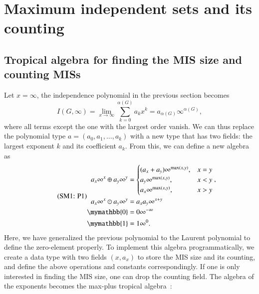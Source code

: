 \documentclass[onefignum, onetabnum]{siamart190516}
\newcommand{\eqname}[1]{\stepcounter{equation}\tag{\theequation : #1}}
\newcommand{\<}{\langle}
\renewcommand{\>}{\rangle}
\begin{document}

\section{Maximum independent sets and its counting}\label{sec:counting}
\subsection{Tropical algebra for finding the MIS size and counting MISs}
Let $x=\infty$, the independence polynomial in the previous section becomes
\begin{equation}
I(G, \infty) = \lim_{x\rightarrow \infty}\sum_{k=0}^{\alpha(G)}a_k x^k = a_{\alpha(G)} \infty^{\alpha(G)},
\end{equation}
where all terms except the one with the largest order vanish. We can thus replace the polynomial type $a = (a_0, a_1, \ldots, a_k)$ with a new type that has two fields: the largest exponent $k$ and its coefficient $a_k$.
From this, we can define a new algebra as
\begin{equation}
    \eqname{P1}
\begin{split}
    a_x\infty^x \oplus a_y\infty^y &= \begin{cases}
        (a_x + a_y)\infty^{\max(x,y)}, & x = y\\
        a_y\infty^{\max(x,y)}, & x < y\\
        a_x\infty^{\max(x,y)}, & x > y
    \end{cases}, \\
    a_x\infty^x \odot a_y\infty^y &= a_x a_y\infty^{x+y}\\
    \mymathbb{0} &= 0\infty^{-\infty}\\
    \mymathbb{1} &= 1\infty^{0}.
\end{split}%
\label{eq:countingtropical}
\end{equation}
Here, we have generalized the previous polynomial to the Laurent polynomial to define the zero-element properly.
To implement this algebra programmatically, we create a data type with two fields $(x, a_x)$ to store the MIS size and its counting,
and define the above operations and constants correspondingly.
If one is only interested in finding the MIS size, one can drop the counting field.
The algebra of the exponents becomes the max-plus tropical algebra~\cite{Maclagan2015, Moore2011}:
\end{document}
